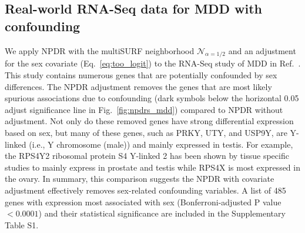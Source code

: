 \documentclass[10pt]{article}
\begin{document}
\subsection{Real-world RNA-Seq data for MDD with confounding}
We apply NPDR with the multiSURF neighborhood $\mathcal{N}_{\alpha=1/2}$ and an adjustment for the sex covariate (Eq.~\ref{eq:too_logit}) to the RNA-Seq study of MDD in Ref.~\cite{mostafavi14}. This study contains numerous genes that are potentially confounded by sex differences. 
The NPDR adjustment removes the genes that are most likely spurious associations due to confounding (dark symbols below the horizontal 0.05 adjust significance line in Fig.~\ref{fig:npdrs_mdd}) compared to NPDR without adjustment. 
Not only do these removed genes have strong differential expression based on sex, but many of these genes, such as PRKY, UTY, and USP9Y, are Y-linked (i.e., Y chromosome (male)) and mainly expressed in testis. For example, the RPS4Y2 ribosomal protein S4 Y-linked 2 has been shown by tissue specific studies to mainly express in prostate and testis \cite{lopes2010human} while RPS4X is most expressed in the ovary. 
In summary, this comparison suggests the NPDR with covariate adjustment effectively removes sex-related confounding variables.
A list of 485 genes with expression most associated with sex (Bonferroni-adjusted P value $<0.0001$) and their statistical significance are included in the Supplementary Table S1.
\end{document}
